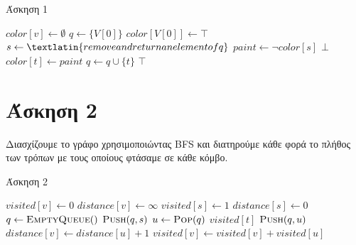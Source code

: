 \documentclass[11pt,a4paper]{book}
\begin{document}
\begin{algorithm}[H]
\caption{\textgreek{Άσκηση 1}}
\begin{algorithmic}[1]

        \State $color[ v ] \gets \emptyset$
    \EndFor
    \State $q \gets \{ V[ 0 ] \}$
    \State $color[ V[ 0 ] ] \gets \top$
        \State $s \gets \textlatin{remove and return an element of q}$
        \State $paint \gets \lnot color[ s ]$
                    \State \Return $\bot$
                \EndIf
            \Else
                \State $color[ t ] \gets paint$
                \State $q \gets q \cup \{ t \}$
            \EndIf
        \EndFor
    \EndWhile
    \State \Return $\top$
\EndProcedure
\end{algorithmic}
\end{algorithm}

\section*{Άσκηση 2}
Διασχίζουμε το γράφο χρησιμοποιώντας \textlatin{BFS} και διατηρούμε κάθε φορά το πλήθος των τρόπων με τους οποίους φτάσαμε σε κάθε κόμβο.

\begin{algorithm}[H]
\caption{\textgreek{Άσκηση 2}}
\begin{algorithmic}[1]

        \State $visited[ v ] \gets 0$
        \State $distance[ v ] \gets \infty$
    \EndFor
    \State $visited[ s ] \gets 1$
    \State $distance[ s ] \gets 0$
    \State $q \gets \Call{EmptyQueue}$
    \State $\Call{Push}{q, s}$
        \State $u \gets \Call{Pop}{q}$
            \State \Return $visited[ t ]$
        \EndIf
                \State $\Call{Push}{q, u}$
            \EndIf
                \State $distance[ v ] \gets distance[ u ] + 1$
                \State $visited[ v ] \gets visited[ v ] + visited[ u ]$
            \EndIf
        \EndFor
    \EndWhile
\EndProcedure
\end{algorithmic}
\end{algorithm}
\end{document}
